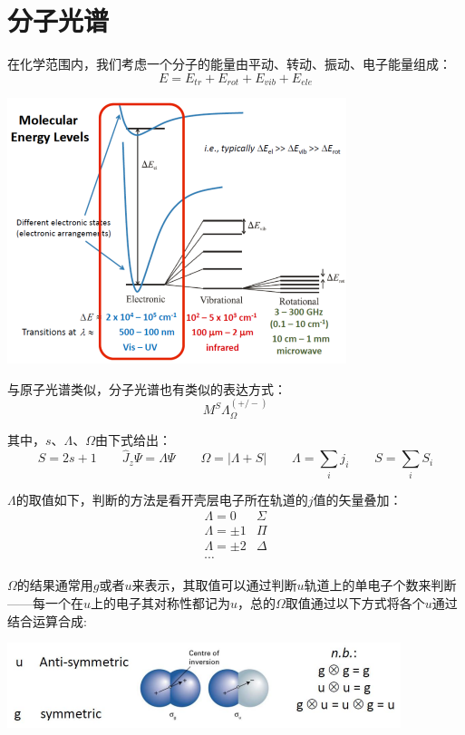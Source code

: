 \section{分子光谱}
在化学范围内，我们考虑一个分子的能量由平动、转动、振动、电子能量组成：
\[E=E_{tr}+E_{rot}+E_{vib}+E_{ele}\]
\begin{center}
    \includegraphics{fig/lzhx/微信图片_20211102175446.png}
\end{center}

与原子光谱类似，分子光谱也有类似的表达方式：
\[M^S\Lambda^{(+/-)}_\Omega\]

其中，$s$、$\Lambda$、$\Omega$由下式给出：
\[S=2s+1 \qquad \hat{J}_z\varPsi=\Lambda\varPsi \qquad \Omega=|\Lambda+S| \qquad \Lambda=\sum_ij_i \qquad S=\sum_iS_i\]

$\Lambda$的取值如下，判断的方法是看开壳层电子所在轨道的$j$值的矢量叠加：
\[\begin{array}{ll}
    \Lambda=0 & \Sigma \\
    \Lambda=\pm 1 & \Pi \\
    \Lambda=\pm 2 & \Delta \\
    \cdots
\end{array}\]

$\Omega$的结果通常用$g$或者$u$来表示，其取值可以通过判断$u$轨道上的单电子个数来判断——每一个在$u$上的电子其对称性都记为$u$，总的$\Omega$取值通过以下方式将各个$u$通过结合运算合成:
\begin{center}
    \includegraphics{fig/lzhx/微信图片_20211106011930.png}
\end{center}

